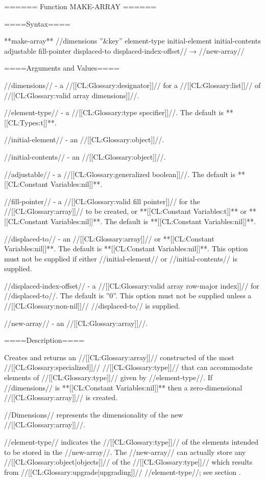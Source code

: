 ====== Function MAKE-ARRAY ======

====Syntax====

**make-array** //dimensions ''&key'' element-type initial-element initial-contents adjustable fill-pointer displaced-to displaced-index-offset// → //new-array//

====Arguments and Values====

//dimensions// - a //[[CL:Glossary:designator]]// for a //[[CL:Glossary:list]]// of //[[CL:Glossary:valid array dimensions]]//.

//element-type// - a //[[CL:Glossary:type specifier]]//. The default is **[[CL:Types:t]]**.

//initial-element// - an //[[CL:Glossary:object]]//.

//initial-contents// - an //[[CL:Glossary:object]]//.

//adjustable// - a //[[CL:Glossary:generalized boolean]]//. The default is **[[CL:Constant Variables:nil]]**.

//fill-pointer// - a //[[CL:Glossary:valid fill pointer]]// for the //[[CL:Glossary:array]]// to be created, or **[[CL:Constant Variables:t]]** or **[[CL:Constant Variables:nil]]**. The default is **[[CL:Constant Variables:nil]]**.

//displaced-to// - an //[[CL:Glossary:array]]// or **[[CL:Constant Variables:nil]]**. The default is **[[CL:Constant Variables:nil]]**. This option must not be supplied if either //initial-element// or //initial-contents// is supplied.

//displaced-index-offset// - a //[[CL:Glossary:valid array row-major index]]// for //displaced-to//. The default is ''0''. This option must not be supplied unless a //[[CL:Glossary:non-nil]]// //displaced-to// is supplied.

//new-array// - an //[[CL:Glossary:array]]//.

====Description====

Creates and returns an //[[CL:Glossary:array]]// constructed of the most //[[CL:Glossary:specialized]]// //[[CL:Glossary:type]]// that can accommodate elements of //[[CL:Glossary:type]]// given by //element-type//. If //dimensions// is **[[CL:Constant Variables:nil]]** then a zero-dimensional //[[CL:Glossary:array]]// is created.

//Dimensions// represents the dimensionality of the new //[[CL:Glossary:array]]//.

//element-type// indicates the //[[CL:Glossary:type]]// of the elements intended to be stored in the //new-array//. The //new-array// can actually store any //[[CL:Glossary:object|objects]]// of the //[[CL:Glossary:type]]// which results from //[[CL:Glossary:upgrade|upgrading]]// //element-type//; see section {\secref\ArrayUpgrading}.


